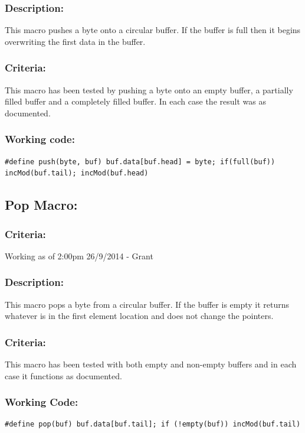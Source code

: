 \documentclass[]{report}
\begin{document}
\subsubsection{Description:}
This macro pushes a byte onto a circular buffer. If the buffer is full then it begins overwriting the first data in the buffer.

\subsubsection{Criteria:}
This macro has been tested by pushing a byte onto an empty buffer, a partially filled buffer and a completely filled buffer. In each case the result was as documented.

\subsubsection{Working code:}
\begin{lstlisting}
#define push(byte, buf) buf.data[buf.head] = byte; if(full(buf)) incMod(buf.tail); incMod(buf.head)
\end{lstlisting}

\subsection{Pop Macro:}
\subsubsection{Criteria:}
Working as of 2:00pm 26/9/2014 - Grant

\subsubsection{Description:}
This macro pops a byte from a circular buffer. If the buffer is empty it returns whatever is in the first element location and does not change the pointers.

\subsubsection{Criteria:}
This macro has been tested with both empty and non-empty buffers and in each case it functions as documented.

\subsubsection{Working Code:}
\begin{lstlisting}
#define pop(buf) buf.data[buf.tail]; if (!empty(buf)) incMod(buf.tail)
\end{lstlisting}
\end{document}
